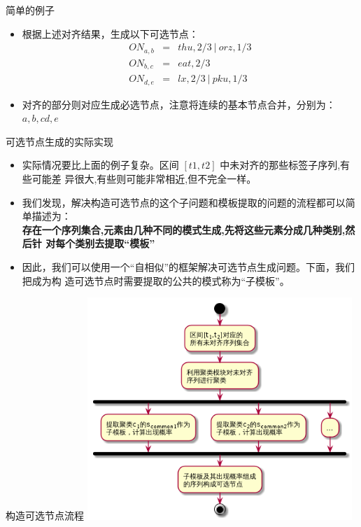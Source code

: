 \documentclass[presentation]{beamer}
\begin{document}
\begin{frame}[label=sec-2-20]{简单的例子}
\begin{itemize}
\item 根据上述对齐结果，生成以下可选节点：
\begin{eqnarray*}
ON_{a,b}&=&thu,2/3~|~orz,1/3\\
ON_{b,c}&=&eat,2/3\\
ON_{d,e}&=&lx,2/3~|~pku,1/3
\end{eqnarray*}
\item 对齐的部分则对应生成必选节点，注意将连续的基本节点合并，分别为： $a,b,cd,e$
\end{itemize}
\end{frame}

\begin{frame}[label=sec-2-21]{可选节点生成的实际实现}
\begin{itemize}
\item 实际情况要比上面的例子复杂。区间 $[t1,t2]$ 中未对齐的那些标签子序列,有些可能差
异很大,有些则可能非常相近,但不完全一样。
\item 我们发现，解决构造可选节点的这个子问题和模板提取的问题的流程都可以简单描述为：
\\
\textbf{\scriptsize
存在一个序列集合,元素由几种不同的模式生成,先将这些元素分成几种类别,然后针
对每个类别去提取“模板”}
\item 因此，我们可以使用一个“自相似”的框架解决可选节点生成问题。下面，我们把成为构
造可选节点时需要提取的公共的模式称为“子模板”。
\end{itemize}
\end{frame}

\begin{frame}[label=sec-2-22]{构造可选节点流程}
\includegraphics[width=0.75\textwidth]{./subtemplate.png}
\end{frame}
\end{document}
